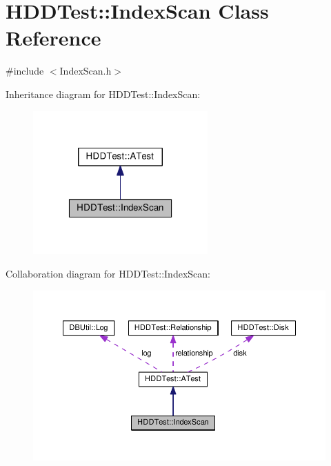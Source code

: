 \hypertarget{class_h_d_d_test_1_1_index_scan}{\section{H\-D\-D\-Test\-:\-:Index\-Scan Class Reference}
\label{class_h_d_d_test_1_1_index_scan}
}


{\ttfamily \#include $<$Index\-Scan.\-h$>$}



Inheritance diagram for H\-D\-D\-Test\-:\-:Index\-Scan\-:\nopagebreak
\begin{figure}[H]
\begin{center}
\leavevmode
\includegraphics[width=190pt]{class_h_d_d_test_1_1_index_scan__inherit__graph}
\end{center}
\end{figure}


Collaboration diagram for H\-D\-D\-Test\-:\-:Index\-Scan\-:\nopagebreak
\begin{figure}[H]
\begin{center}
\leavevmode
\includegraphics[width=350pt]{class_h_d_d_test_1_1_index_scan__coll__graph}
\end{center}
\end{figure}

